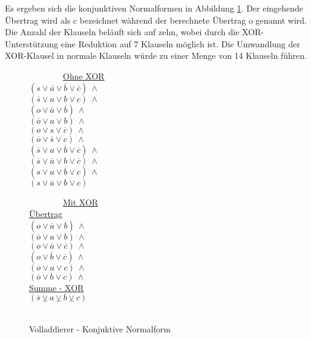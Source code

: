 Es ergeben sich die konjunktiven Normalformen in Abbildung \ref{fig:fulladder_cnf}. Der eingehende Übertrag wird als c bezeichnet während der
berechnete Übertrag o genannt wird. Die Anzahl der Klauseln beläuft sich auf zehn, wobei durch die XOR-Unterstützung
eine Reduktion auf 7 Klauseln möglich ist. Die Umwandlung der XOR-Klausel in normale Klauseln würde zu einer Menge von 14 Klauseln führen.
\begin{figure}[!h]
  \centering
  \begin{minipage}[l]{5cm}
    ~~~~~~~~\underline{Ohne XOR}\\
    $ (s \vee \overline{a} \vee \overline{b} \vee \overline{c}) ~ \wedge $\\
    $ (\overline{s} \vee a \vee b \vee c) ~ \wedge $\\
    $ (o \vee \overline{a} \vee \overline{b}) ~ \wedge $\\
    $ (\overline{o} \vee a \vee b) ~ \wedge $\\
    $ (o \vee s \vee \overline{c}) ~ \wedge $\\
    $ (\overline{o} \vee \overline{s} \vee c) ~ \wedge $\\
    $ (\overline{s} \vee a \vee \overline{b} \vee \overline{c}) ~ \wedge $\\
    $ (\overline{s} \vee \overline{a} \vee b \vee \overline{c}) ~ \wedge $\\
    $ (s \vee a \vee \overline{b} \vee c) ~ \wedge $\\
    $ (s \vee \overline{a} \vee b \vee c) $
  \end{minipage}
  \begin{minipage}[l]{5cm}
    ~~~~~~~~\underline{Mit XOR}\\
    \underline{Übertrag}\\
    $ (o \vee \overline{a} \vee \overline{b}) ~ \wedge $\\
    $ (\overline{o} \vee a \vee b) ~ \wedge $\\
    $ (o \vee \overline{a} \vee \overline{c}) ~ \wedge $\\
    $ (o \vee \overline{b} \vee \overline{c}) ~ \wedge $\\
    $ (\overline{o} \vee a \vee c) ~ \wedge $\\
    $ (\overline{o} \vee b \vee c) ~ \wedge $\\
    \underline{Summe - XOR}\\
    $ (\overline{s} \veebar a \veebar b \veebar c) $\\
    ~
  \end{minipage}
  \caption{Volladdierer - Konjuktive Normalform}
  \label{fig:fulladder_cnf}
\end{figure}

